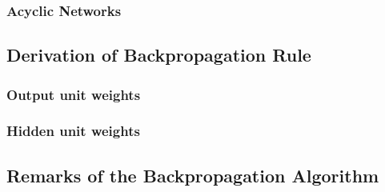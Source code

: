 		\subsubsection{Acyclic Networks}
	\subsection{Derivation of Backpropagation Rule}
		\subsubsection{Output unit weights}
		\subsubsection{Hidden unit weights}
	\subsection{Remarks of the Backpropagation Algorithm}
